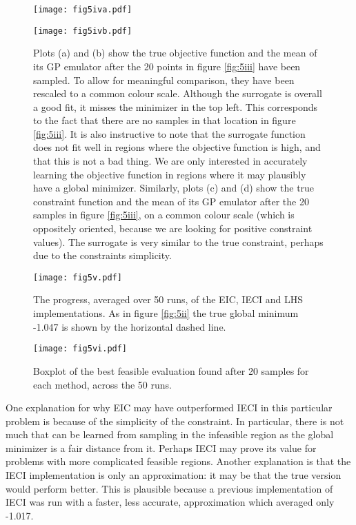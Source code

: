 \begin{figure}
\centering
\texttt{[image: fig5iva.pdf]}

\vspace{-20pt}

\texttt{[image: fig5ivb.pdf]}
\caption{
Plots (a) and (b) show the true objective function and the mean of its GP emulator after the 20 points in figure \ref{fig:5iii} have been sampled. To allow for meaningful comparison, they have been rescaled to a common colour scale. Although the surrogate is overall a good fit, it misses the minimizer in the top left. This corresponds to the fact that there are no samples in that location in figure \ref{fig:5iii}. It is also instructive to note that the surrogate function does not fit well in regions where the objective function is high, and that this is not a bad thing. We are only interested in accurately learning the objective function in regions where it may plausibly have a global minimizer.
% 
Similarly, plots (c) and (d) show the true constraint function and the mean of its GP emulator after the 20 samples in figure \ref{fig:5iii}, on a common colour scale (which is oppositely oriented, because we are looking for positive constraint values). The surrogate is very similar to the true constraint, perhaps due to the constraints simplicity.} 
\label{fig:5iv}
\end{figure}

\begin{figure}
\centering
\texttt{[image: fig5v.pdf]}
\caption{The progress, averaged over 50 runs, of the EIC, IECI and LHS implementations. As in figure \ref{fig:5ii} the true global minimum -1.047 is shown by the horizontal dashed line.} 
\label{fig:5v}
\end{figure}

\begin{figure}
\centering
\texttt{[image: fig5vi.pdf]}
\caption{Boxplot of the best feasible evaluation found after 20 samples for each method, across the 50 runs.} 
\label{fig:5vi}
\end{figure}

One explanation for why EIC may have outperformed IECI in this particular problem is because of the simplicity of the constraint. In particular, there is not much that can be learned from sampling in the infeasible region as the global minimizer is a fair distance from it. Perhaps IECI may prove its value for problems with more complicated feasible regions. Another explanation is that the IECI implementation is only an approximation: it may be that the true version would perform better. This is plausible because a previous implementation of IECI was run with a faster, less accurate, approximation which averaged only -1.017.

